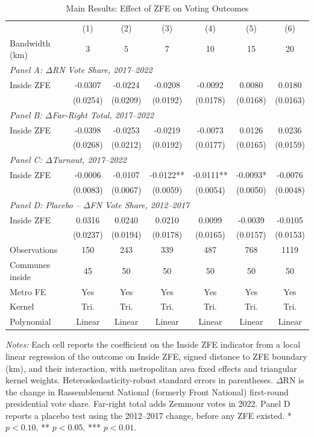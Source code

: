 \begin{table}[H]
\centering
\caption{Main Results: Effect of ZFE on Voting Outcomes}
\label{tab:main}
\begin{threeparttable}
\begin{tabular}{lcccccc}
\toprule
 & (1) & (2) & (3) & (4) & (5) & (6) \\
Bandwidth (km) & 3 & 5 & 7 & 10 & 15 & 20 \\
\midrule
\multicolumn{7}{l}{\textit{Panel A: $\Delta$RN Vote Share, 2017--2022}} \\[3pt]
  Inside ZFE & -0.0307 & -0.0224 & -0.0208 & -0.0092 & 0.0080 & 0.0180 \\
   & (0.0254) & (0.0209) & (0.0192) & (0.0178) & (0.0168) & (0.0163) \\[6pt]
\multicolumn{7}{l}{\textit{Panel B: $\Delta$Far-Right Total, 2017--2022}} \\[3pt]
  Inside ZFE & -0.0398 & -0.0253 & -0.0219 & -0.0073 & 0.0126 & 0.0236 \\
   & (0.0268) & (0.0212) & (0.0192) & (0.0177) & (0.0165) & (0.0159) \\[6pt]
\multicolumn{7}{l}{\textit{Panel C: $\Delta$Turnout, 2017--2022}} \\[3pt]
  Inside ZFE & -0.0006 & -0.0107 & -0.0122** & -0.0111** & -0.0093* & -0.0076 \\
   & (0.0083) & (0.0067) & (0.0059) & (0.0054) & (0.0050) & (0.0048) \\[6pt]
\multicolumn{7}{l}{\textit{Panel D: Placebo -- $\Delta$FN Vote Share, 2012--2017}} \\[3pt]
  Inside ZFE & 0.0316 & 0.0240 & 0.0210 & 0.0099 & -0.0039 & -0.0105 \\
   & (0.0237) & (0.0194) & (0.0178) & (0.0165) & (0.0157) & (0.0153) \\
\midrule
  Observations & 150 & 243 & 339 & 487 & 768 & 1119 \\
  Communes inside & 45 & 50 & 50 & 50 & 50 & 50 \\
  Metro FE & Yes & Yes & Yes & Yes & Yes & Yes \\
  Kernel & Tri. & Tri. & Tri. & Tri. & Tri. & Tri. \\
  Polynomial & Linear & Linear & Linear & Linear & Linear & Linear \\
\bottomrule
\end{tabular}
\begin{tablenotes}[flushleft]
\small
\item \textit{Notes:} Each cell reports the coefficient on the Inside ZFE indicator from a local linear regression of the outcome on Inside ZFE, signed distance to ZFE boundary (km), and their interaction, with metropolitan area fixed effects and triangular kernel weights. Heteroskedasticity-robust standard errors in parentheses. $\Delta$RN is the change in Rassemblement National (formerly Front National) first-round presidential vote share. Far-right total adds Zemmour votes in 2022. Panel D reports a placebo test using the 2012--2017 change, before any ZFE existed. * $p<0.10$, ** $p<0.05$, *** $p<0.01$.
\end{tablenotes}
\end{threeparttable}
\end{table}
